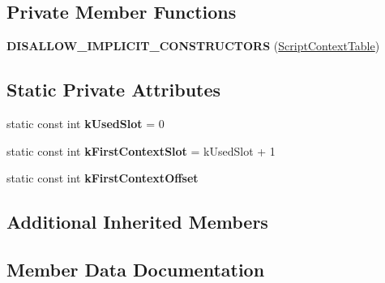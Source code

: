 \subsection*{Private Member Functions}
\begin{DoxyCompactItemize}
\item 
{\bfseries D\+I\+S\+A\+L\+L\+O\+W\+\_\+\+I\+M\+P\+L\+I\+C\+I\+T\+\_\+\+C\+O\+N\+S\+T\+R\+U\+C\+T\+O\+RS} (\hyperlink{classv8_1_1internal_1_1_script_context_table}{Script\+Context\+Table})\hypertarget{classv8_1_1internal_1_1_script_context_table_a0e53506c10964fbd538fb574b78ea56e}{}\label{classv8_1_1internal_1_1_script_context_table_a0e53506c10964fbd538fb574b78ea56e}

\end{DoxyCompactItemize}
\subsection*{Static Private Attributes}
\begin{DoxyCompactItemize}
\item 
static const int {\bfseries k\+Used\+Slot} = 0\hypertarget{classv8_1_1internal_1_1_script_context_table_a34e3bdfeb2e541393e1e687872a5b9c6}{}\label{classv8_1_1internal_1_1_script_context_table_a34e3bdfeb2e541393e1e687872a5b9c6}

\item 
static const int {\bfseries k\+First\+Context\+Slot} = k\+Used\+Slot + 1\hypertarget{classv8_1_1internal_1_1_script_context_table_a6039d3e88b1abdb2dc0b64e213acfead}{}\label{classv8_1_1internal_1_1_script_context_table_a6039d3e88b1abdb2dc0b64e213acfead}

\item 
static const int {\bfseries k\+First\+Context\+Offset}
\end{DoxyCompactItemize}
\subsection*{Additional Inherited Members}


\subsection{Member Data Documentation}
